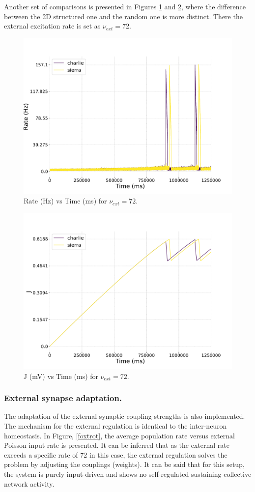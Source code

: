 \documentclass[a4paper,12pt]{article}
\begin{document}
Another set of comparisons is presented in Figures \ref{charlie72ratevstime} and \ref{charlie72alphavstime}, where the difference between the 2D structured one and the random one is more distinct. There the external excitation rate is set as $\nu_{ext} =  72.$
\begin{figure}[H] 
    \centering
    \includegraphics[width=0.8\linewidth]{nu_ext_72rate_over_time_homeostasis.pdf}
    \caption{Rate (Hz) vs Time (ms) for $\nu_{ext} = 72$.}
    \label{charlie72ratevstime}
\end{figure}
\begin{figure}[H] 
    \centering
    \includegraphics[width=0.8\linewidth]{nu_ext_72alpha_over_time_homeostasis.pdf}
    \caption{J (mV) vs Time (ms) for $\nu_{ext} = 72$.}
    \label{charlie72alphavstime}
\end{figure}

\subsubsection{External synapse adaptation.}
The adaptation of the external synaptic coupling strengths is also implemented. The mechanism for the external regulation is identical to the inter-neuron homeostasis. In Figure, \ref{foxtrot}, the average population rate versus external Poisson input rate is presented. It can be inferred that as the external rate exceeds a specific rate of 72 in this case, the external regulation solves the problem by adjusting the couplings (weights). It can be said that for this setup, the system is purely input-driven and shows no self-regulated sustaining collective network activity.
\end{document}
